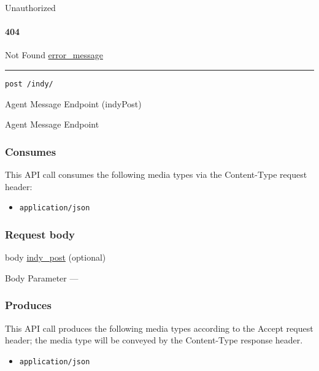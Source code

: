 Unauthorized \protect\hyperlink{}{}

\hypertarget{section-311}{%
\paragraph{404}\label{section-311}}

Not Found \protect\hyperlink{error_message}{error\_message}

\begin{center}\rule{0.5\linewidth}{\linethickness}\end{center}

\protect\hypertarget{indyPost}{}{}

\begin{verbatim}
post /indy/
\end{verbatim}

Agent Message Endpoint ({indyPost})

Agent Message Endpoint

\hypertarget{consumes-31}{%
\subsubsection{Consumes}\label{consumes-31}}

This API call consumes the following media types via the {Content-Type}
request header:

\begin{itemize}
\tightlist
\item
  \texttt{application/json}
\end{itemize}

\hypertarget{request-body-31}{%
\subsubsection{Request body}\label{request-body-31}}

body \protect\hyperlink{indy_post}{indy\_post} (optional)

{Body Parameter} ---

\hypertarget{produces-93}{%
\subsubsection{Produces}\label{produces-93}}

This API call produces the following media types according to the
{Accept} request header; the media type will be conveyed by the
{Content-Type} response header.

\begin{itemize}
\tightlist
\item
  \texttt{application/json}
\end{itemize}

